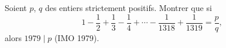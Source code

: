 Soient $p$, $q$ des entiers strictement positifs. Montrer que si
\[ 1 - \frac{1}{2} + \frac{1}{3} - \frac{1}{4} + \cdots - \frac{1}{1318} + \frac{1}{1319} = \frac{p}{q}, \]
alors $1979 \mid p$ \quad (IMO 1979).
